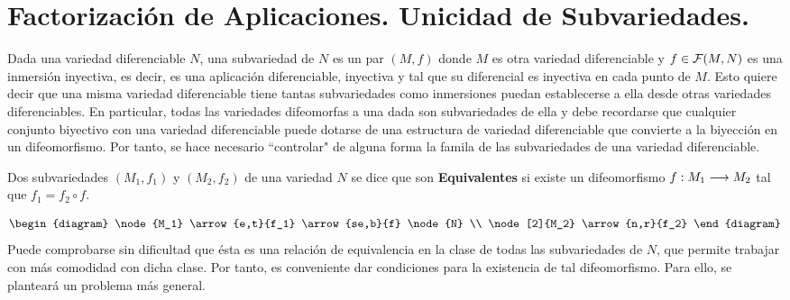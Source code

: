 \documentclass[cursovd_portada.tex]{subfiles}
\begin{document}
\section{Factorización de Aplicaciones. Unicidad de Subvariedades.}
\hs Dada una variedad diferenciable $N$, una subvariedad de $N$ es un par $(M,f)$ donde $M$ es otra variedad
diferenciable y $f\in{\cal F}(M,N)$ es una inmersión inyectiva, es decir, es una aplicación diferenciable,
inyectiva y tal que su diferencial es inyectiva en cada punto de $M$. Esto quiere decir que una misma variedad
diferenciable tiene tantas subvariedades como inmersiones puedan establecerse a ella desde otras variedades
diferenciables. En particular, todas las variedades difeomorfas a una dada son subvariedades de ella y debe
recordarse que cualquier conjunto biyectivo con una variedad diferenciable puede dotarse de una estructura de
variedad diferenciable que convierte a la biyección en un difeomorfismo. Por tanto, se hace necesario ``controlar"
de alguna forma la famila de las subvariedades de una variedad diferenciable.
\begin{defi}
Dos subvariedades $(M_1,f_1)$ y $(M_2,f_2)$ de una variedad $N$ se
dice que son {\bf Equivalentes} si existe un difeomorfismo
$f:M_1\longrightarrow M_2$ tal que $f_1=f_2\circ f$.
\end{defi}
$$\begin{diagram}
\node{M_1} \arrow{e,t}{f_1} \arrow{se,b}{f} \node{N} \\
\node[2]{M_2} \arrow{n,r}{f_2}
\end{diagram}$$
\hs Puede comprobarse sin dificultad que ésta es una
relación de equivalencia en la clase de todas las
subvariedades de $N$, que permite trabajar con más comodidad
con dicha clase. Por tanto, es conveniente dar condiciones para la
existencia de tal difeomorfismo. Para ello, se planteará un
problema más general.
\end{document}
